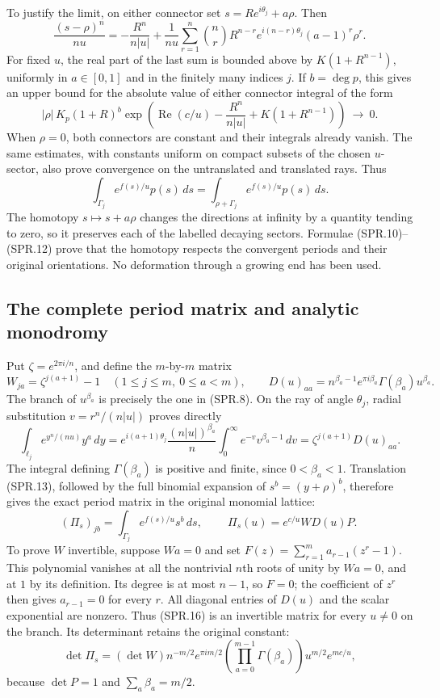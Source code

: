To justify the limit, on either connector set
\(s=Re^{i\theta_j}+a\rho\). Then
\[
 \frac{(s-\rho)^n}{nu}
 =-\frac{R^n}{n|u|}
   +\frac1{nu}\sum_{r=1}^n
       \binom nr R^{n-r}e^{i(n-r)\theta_j}
                      (a-1)^r\rho^r .
 \tag{SPR.11}
\]
For fixed \(u\), the real part of the last sum is bounded above by
\(K(1+R^{n-1})\), uniformly in \(a\in[0,1]\) and in the finitely
many indices \(j\). If \(b=\deg p\), this gives an upper bound for
the absolute value of either connector integral of the form
\[
 |\rho|\,K_p(1+R)^b
 \exp\left(\operatorname{Re}(c/u)
       -\frac{R^n}{n|u|}+K(1+R^{n-1})\right)
 \ \longrightarrow\ 0 .
 \tag{SPR.12}
\]
When \(\rho=0\), both connectors are constant and their integrals
already vanish. The same estimates, with constants uniform on compact
subsets of the chosen \(u\)-sector, also prove convergence on the
untranslated and translated rays. Thus
\[
 \int_{\Gamma_j}e^{f(s)/u}p(s)\,ds
 =\int_{\rho+\Gamma_j}e^{f(s)/u}p(s)\,ds .
 \tag{SPR.13}
\]
The homotopy \(s\mapsto s+a\rho\) changes the directions at infinity
by a quantity tending to zero, so it preserves each of the labelled
decaying sectors. Formulae (SPR.10)--(SPR.12) prove that the homotopy
respects the convergent periods and their original orientations.
No deformation through a growing end has been used.

\subsection*{The complete period matrix and analytic monodromy}

Put \(\zeta=e^{2\pi i/n}\), and define the \(m\)-by-\(m\) matrix
\[
 W_{ja}=\zeta^{j(a+1)}-1
 \quad(1\leq j\leq m,\ 0\leq a<m),\qquad
 D(u)_{aa}
   =n^{\beta_a-1}e^{\pi i\beta_a}
               \Gamma(\beta_a)u^{\beta_a}.
 \tag{SPR.14}
\]
The branch of \(u^{\beta_a}\) is precisely the one in (SPR.8).
On the ray of angle \(\theta_j\), radial substitution
\(v=r^n/(n|u|)\) proves directly
\[
 \int_{\ell_j} e^{y^n/(nu)}y^a\,dy
 =e^{i(a+1)\theta_j}\frac{(n|u|)^{\beta_a}}n
       \int_0^\infty e^{-v}v^{\beta_a-1}\,dv
 =\zeta^{j(a+1)}D(u)_{aa}.
 \tag{SPR.15}
\]
The integral defining \(\Gamma(\beta_a)\) is positive and finite,
since \(0<\beta_a<1\). Translation (SPR.13), followed by the full
binomial expansion of \(s^b=(y+\rho)^b\), therefore gives the exact
period matrix in the original monomial lattice:
\[
 (\Pi_s)_{jb}=\int_{\Gamma_j}e^{f(s)/u}s^b\,ds,\qquad
 \boxed{\ \Pi_s(u)=e^{c/u}W D(u)P.\ }
 \tag{SPR.16}
\]
To prove \(W\) invertible, suppose \(Wa=0\) and set
\(F(z)=\sum_{r=1}^m a_{r-1}(z^r-1)\). This polynomial vanishes
at all the nontrivial \(n\)th roots of unity by \(Wa=0\), and at
\(1\) by its definition. Its degree is at most \(n-1\), so \(F=0\);
the coefficient of \(z^r\) then gives \(a_{r-1}=0\) for every \(r\).
All diagonal entries of \(D(u)\) and the scalar exponential are
nonzero. Thus (SPR.16) is an invertible matrix for every \(u\ne0\)
on the branch. Its determinant retains the original constant:
\[
 \det\Pi_s
 =(\det W)n^{-m/2}e^{\pi i m/2}
     \left(\prod_{a=0}^{m-1}\Gamma(\beta_a)\right)
        u^{m/2}e^{mc/u},
 \tag{SPR.17}
\]
because \(\det P=1\) and \(\sum_a\beta_a=m/2\).

